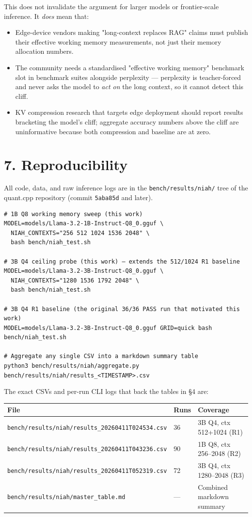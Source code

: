 \documentclass[11pt]{article}
\begin{document}
This does not invalidate the argument for larger models or frontier-scale inference. It \textit{does} mean that:

\begin{itemize}
\item Edge-device vendors making "long-context replaces RAG" claims must publish their effective working memory measurements, not just their memory allocation numbers.
\item The community needs a standardised "effective working memory" benchmark slot in benchmark suites alongside perplexity — perplexity is teacher-forced and never asks the model to \textit{act on} the long context, so it cannot detect this cliff.
\item KV compression research that targets edge deployment should report results bracketing the model's cliff; aggregate accuracy numbers above the cliff are uninformative because both compression and baseline are at zero.
\end{itemize}


\section*{7. Reproducibility}


All code, data, and raw inference logs are in the \texttt{bench/results/niah/} tree of the quant.cpp repository (commit \texttt{5aba85d} and later).


\begin{lstlisting}
# 1B Q8 working memory sweep (this work)
MODEL=models/Llama-3.2-1B-Instruct-Q8_0.gguf \
  NIAH_CONTEXTS="256 512 1024 1536 2048" \
  bash bench/niah_test.sh

# 3B Q4 ceiling probe (this work) — extends the 512/1024 R1 baseline
MODEL=models/Llama-3.2-3B-Instruct-Q8_0.gguf \
  NIAH_CONTEXTS="1280 1536 1792 2048" \
  bash bench/niah_test.sh

# 3B Q4 R1 baseline (the original 36/36 PASS run that motivated this work)
MODEL=models/Llama-3.2-3B-Instruct-Q8_0.gguf GRID=quick bash bench/niah_test.sh

# Aggregate any single CSV into a markdown summary table
python3 bench/results/niah/aggregate.py bench/results/niah/results_<TIMESTAMP>.csv
\end{lstlisting}


The exact CSVs and per-run CLI logs that back the tables in §4 are:


\begin{center}
\begin{tabular}{lll}
\toprule
File & Runs & Coverage \\
\midrule
\texttt{bench/results/niah/results\_20260411T024534.csv} & 36 & 3B Q4, ctx 512+1024 (R1) \\
\texttt{bench/results/niah/results\_20260411T043236.csv} & 90 & 1B Q8, ctx 256–2048 (R2) \\
\texttt{bench/results/niah/results\_20260411T052319.csv} & 72 & 3B Q4, ctx 1280–2048 (R3) \\
\texttt{bench/results/niah/master\_table.md} & — & Combined markdown summary \\
\bottomrule
\end{tabular}
\end{center}
\end{document}
